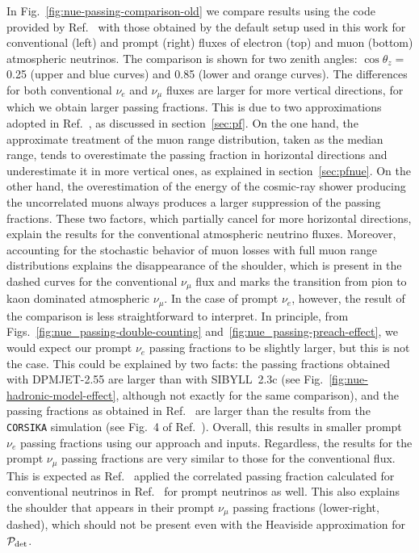 \documentclass[aps,prd,showpacs,letterpaper,onecolumn,longbibliography,superscriptaddress,notitlepage,nofootinbib]{revtex4-1}%
\newcommand{\Prob}{{\cal P}}
\newcommand{\CORSIKA}{\texttt{CORSIKA}}
\begin{document}
In Fig.~\ref{fig:nue-passing-comparison-old} we compare results using the code provided by Ref.~\cite{Gaisser:2014bja} with those obtained by the default setup used in this work for conventional (left) and prompt (right) fluxes of electron (top) and muon (bottom) atmospheric neutrinos. The comparison is shown for two zenith angles: $\cos\theta_z = $ 0.25 (upper and blue curves) and 0.85 (lower and orange curves). The differences for both conventional $\nu_e$ and $\nu_\mu$ fluxes are larger for more vertical directions, for which we obtain larger passing fractions. This is due to two approximations adopted in Ref.~\cite{Gaisser:2014bja}, as discussed in section~\ref{sec:pf}. On the one hand, the approximate treatment of the muon range distribution, taken as the median range, tends to overestimate the passing fraction in horizontal directions and underestimate it in more vertical ones, as explained in section~\ref{sec:pfnue}. On the other hand, the overestimation of the energy of the cosmic-ray shower producing the uncorrelated muons always produces a larger suppression of the passing fractions. These two factors, which partially cancel for more horizontal directions, explain the results for the conventional atmospheric neutrino fluxes. Moreover, accounting for the stochastic behavior of muon losses with full muon range distributions explains the disappearance of the shoulder, which is present in the dashed curves for the conventional $\nu_\mu$ flux and marks the transition from pion to kaon dominated atmospheric $\nu_\mu$. In the case of prompt $\nu_e$, however, the result of the comparison is less straightforward to interpret. In principle, from Figs.~\ref{fig:nue_passing-double-counting} and~\ref{fig:nue_passing-preach-effect}, we would expect our prompt $\nu_e$ passing fractions to be slightly larger, but this is not the case. This could be explained by two facts: the passing fractions obtained with DPMJET-2.55 are larger than with SIBYLL~2.3c (see Fig.~\ref{fig:nue-hadronic-model-effect}, although not exactly for the same comparison), and the passing fractions as obtained in Ref.~\cite{Gaisser:2014bja} are larger than the results from the \CORSIKA{} simulation (see Fig.~4 of Ref.~\cite{Gaisser:2014bja}). Overall, this results in smaller prompt $\nu_e$ passing fractions using our approach and inputs. Regardless, the results for the prompt $\nu_\mu$ passing fractions are very similar to those for the conventional flux. This is expected as Ref.~\cite{Gaisser:2014bja} applied the correlated passing fraction calculated for conventional neutrinos in Ref.~\cite{Schonert:2008is} for prompt neutrinos as well. This also explains the shoulder that appears in their prompt $\nu_\mu$ passing fractions (lower-right, dashed), which should not be present even with the Heaviside approximation for $\Prob_{\rm det}$. 
\end{document}
